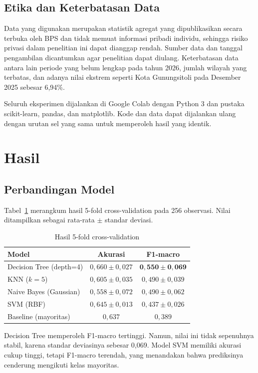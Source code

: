 \documentclass[conference]{IEEEtran}
\begin{document}
\subsection{Etika dan Keterbatasan Data}
Data yang digunakan merupakan statistik agregat yang dipublikasikan secara terbuka oleh BPS dan tidak memuat informasi pribadi individu, sehingga risiko privasi dalam penelitian ini dapat dianggap rendah. Sumber data dan tanggal pengambilan dicantumkan agar penelitian dapat diulang. Keterbatasan data antara lain periode yang belum lengkap pada tahun 2026, jumlah wilayah yang terbatas, dan adanya nilai ekstrem seperti Kota Gunungsitoli pada Desember 2025 sebesar 6,94\%.

Seluruh eksperimen dijalankan di Google Colab dengan Python 3 dan pustaka scikit-learn, pandas, dan matplotlib. Kode dan data dapat dijalankan ulang dengan urutan sel yang sama untuk memperoleh hasil yang identik.

\section{Hasil}
\subsection{Perbandingan Model}
Tabel~\ref{tab:hasil} merangkum hasil 5-fold cross-validation pada 256 observasi. Nilai ditampilkan sebagai rata-rata $\pm$ standar deviasi.

\begin{table}[htbp]
\caption{Hasil 5-fold cross-validation}
\label{tab:hasil}
\centering
\begin{tabular}{lcc}
\toprule
Model & Akurasi & F1-macro \\
\midrule
Decision Tree (depth=4) & $0{,}660 \pm 0{,}027$ & $\mathbf{0{,}550 \pm 0{,}069}$ \\
KNN ($k=5$) & $0{,}605 \pm 0{,}035$ & $0{,}490 \pm 0{,}039$ \\
Naive Bayes (Gaussian) & $0{,}558 \pm 0{,}072$ & $0{,}490 \pm 0{,}062$ \\
SVM (RBF) & $0{,}645 \pm 0{,}013$ & $0{,}437 \pm 0{,}026$ \\
\midrule
Baseline (mayoritas) & $0{,}637$ & $0{,}389$ \\
\bottomrule
\end{tabular}
\end{table}

Decision Tree memperoleh F1-macro tertinggi. Namun, nilai ini tidak sepenuhnya stabil, karena standar deviasinya sebesar 0,069. Model SVM memiliki akurasi cukup tinggi, tetapi F1-macro terendah, yang menandakan bahwa prediksinya cenderung mengikuti kelas mayoritas.
\end{document}
